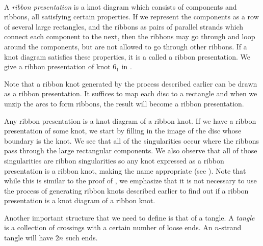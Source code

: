 \begin{paper}
\\

A \textit{ribbon presentation} is a knot diagram which consists of components
and ribbons, all satisfying certain properties.
If we represent the components as a row of several large rectangles, and the
ribbons as pairs of parallel strands which connect each component to the next,
then the ribbons may go through and loop around the components, but are not
allowed to go through other ribbons.
If a knot diagram satisfies these properties, it is a called a ribbon
presentation.
We give a ribbon presentation of knot $6_1$ in \figPresentation.

Note that a ribbon knot generated by the process described earlier can be drawn
as a ribbon presentation.
It suffices to map each disc to a rectangle and when we unzip the arcs to form
ribbons, the result will become a ribbon presentation.

Any ribbon presentation is a knot diagram of a ribbon knot.
If we have a ribbon presentation of some knot, we start by filling in the image
of the disc whose boundary is the knot.
We see that all of the singularities occur where the ribbons pass through the
large rectangular components.
We also observe that all of those singularities are ribbon singularities so any
knot expressed as a ribbon presentation is a ribbon knot, making the name
appropriate (see \figSingularities).
Note that while this is similar to the proof of \prpGeneration, we emphasize
that it is not necessary to use the process of generating ribbon knots described
earlier to find out if a ribbon presentation is a knot diagram of a ribbon knot.


Another important structure that we need to define is that of a tangle.
A \textit{tangle} is a collection of crossings with a certain number of loose
ends.
An $n$-strand tangle will have $2n$ such ends.\\


\end{paper}
